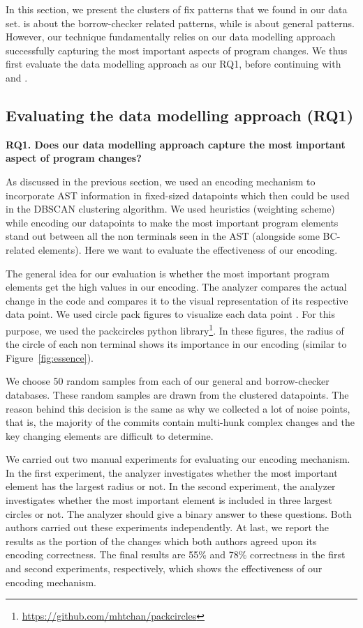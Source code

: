 In this section, we present the clusters of fix patterns that we found in our data set. \RQBC{} is about the borrow-checker related patterns, while \RQG{} is about general patterns. However, our technique fundamentally relies on our data modelling approach successfully capturing the most important aspects of program changes. We thus first evaluate the data modelling approach as our RQ1, before continuing with \RQBC{} and \RQG{}.

\subsection{Evaluating the data modelling approach (RQ1)}

\textbf{RQ1. Does our data modelling approach capture the most important aspect of program changes?} 

As discussed in the previous section, we used an encoding mechanism to incorporate AST information in fixed-sized datapoints which then could be used in the DBSCAN clustering algorithm. We used heuristics (weighting scheme) while encoding our datapoints to make the most important program elements stand out between all the non terminals seen in the AST (alongside some BC-related elements). Here we want to evaluate the effectiveness of our encoding.

The general idea for our evaluation is whether the most important program elements get the high values in our encoding. The analyzer compares the actual change in the code and compares it to the visual representation of its respective data point. We used circle pack figures to visualize each data point \cite{collins2003circle}. For this purpose, we used the packcircles python library\footnote{\url{https://github.com/mhtchan/packcircles}}. In these figures, the radius of the circle of each non terminal shows its importance in our encoding (similar to Figure~\ref{fig:essence}).

We choose 50 random samples from each of our general and borrow-checker databases. These random samples are drawn from the clustered datapoints. The reason behind this decision is the same as why we collected a lot of noise points, that is, the majority of the commits contain multi-hunk complex changes and the key changing elements are difficult to determine.

We carried out two manual experiments for evaluating our encoding mechanism. In the first experiment, the analyzer investigates whether the most important element has the largest radius or not. In the second experiment, the analyzer investigates whether the most important element is included in three largest circles or not. The analyzer should give a binary answer to these questions. Both authors carried out these experiments independently. At last, we report the results as the portion of the changes which both authors agreed upon its encoding correctness. The final results are 55\% and 78\% correctness in the first and second experiments, respectively, which shows the effectiveness of our encoding mechanism.


